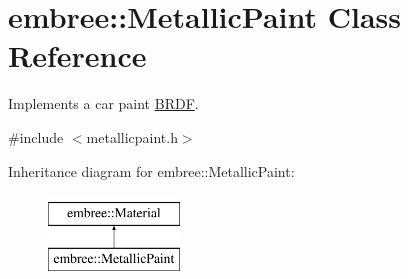 \hypertarget{classembree_1_1_metallic_paint}{
\section{embree::MetallicPaint Class Reference}
\label{classembree_1_1_metallic_paint}
}


Implements a car paint \hyperlink{classembree_1_1_b_r_d_f}{BRDF}.  




{\ttfamily \#include $<$metallicpaint.h$>$}

Inheritance diagram for embree::MetallicPaint:\begin{figure}[H]
\begin{center}
\leavevmode
\includegraphics[height=2.000000cm]{classembree_1_1_metallic_paint}
\end{center}
\end{figure}

